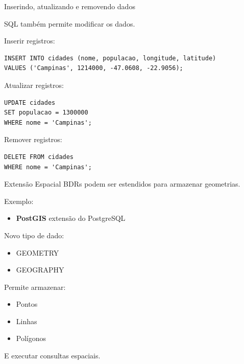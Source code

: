 \documentclass{beamer}
\begin{document}
\begin{frame}[fragile]{Inserindo, atualizando e removendo dados}
    
    SQL também permite modificar os dados.
    
    \vspace{0.3cm}
    
    Inserir registros:
    
\vspace{0.3cm}

\begin{verbatim}
INSERT INTO cidades (nome, populacao, longitude, latitude)
VALUES ('Campinas', 1214000, -47.0608, -22.9056);
\end{verbatim}
    
    Atualizar registros:
    
    \begin{verbatim}
UPDATE cidades
SET populacao = 1300000
WHERE nome = 'Campinas';
    \end{verbatim}
    
    Remover registros:
    
    \begin{verbatim}
DELETE FROM cidades
WHERE nome = 'Campinas';
    \end{verbatim}
    
\end{frame}

\begin{frame}{Extensão Espacial}
    BDRs podem ser estendidos para armazenar geometrias.
    
    \vspace{0.4cm}
    
    Exemplo:
    \begin{itemize}
        \item \textbf{PostGIS} extensão do PostgreSQL
    \end{itemize}
    
    \vspace{0.4cm}
    
    Novo tipo de dado:
    \begin{itemize}
        \item GEOMETRY
        \item GEOGRAPHY
    \end{itemize}
    
    \vspace{0.4cm}
    
    Permite armazenar:
    \begin{itemize}
        \item Pontos
        \item Linhas
        \item Polígonos
    \end{itemize}
    E executar consultas espaciais.
\end{frame}
\end{document}
